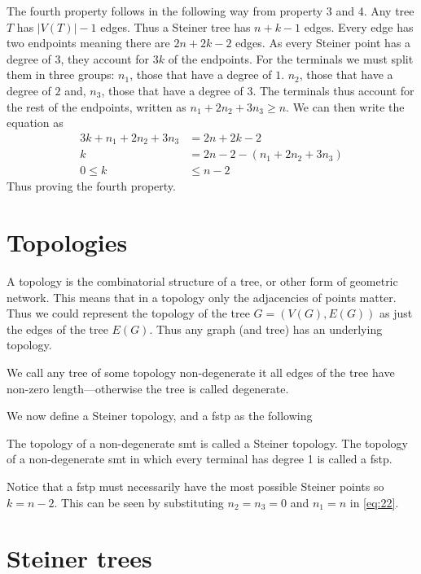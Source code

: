 The fourth property follows in the following way from property 3 and 4. Any
tree $T$ has $|V(T)|-1$ edges. Thus a Steiner tree has $n+k-1$ edges.
Every edge has two endpoints meaning there are $2 n + 2 k - 2$ edges. As every
Steiner point has a degree of $3$, they account for $3 k$ of the endpoints. For
the terminals we must split them in three groups: $n_1$, those that have a
degree of $1$. $n_2$, those that have a degree of $2$ and, $n_3$, those that
have a degree of $3$. The terminals thus account for the rest of the
endpoints, written as $n_1 + 2 n_2 + 3 n_3 \ge n$. We can then write the
equation as
%
\begin{align}
  \label{eq:22}
  3 k + n_1 + 2 n_2 + 3 n_3 &= 2 n + 2 k - 2 \\
  k &= 2 n - 2 - (n_1 + 2 n_2 + 3 n_3) \\
  0 \le k &\le n - 2
\end{align}
%
Thus proving the fourth property.

\section{Topologies}
\label{sec:topologies-1}

A topology is the combinatorial structure of a tree, or other form of geometric
network. This means that in a topology only the adjacencies of points
matter. Thus we could represent the topology of the tree $G = (V(G), E(G))$ as
just the edges of the tree $E(G)$. Thus any graph (and tree) has an
underlying topology.

We call any tree of some topology non-degenerate it all edges of the tree have
non-zero length---otherwise the tree is called degenerate.

We now define a Steiner topology, and a \gls{fstp} as the following
%
\begin{definition}
The topology of a non-degenerate \gls{smt} is called a Steiner topology. The
topology of a non-degenerate \gls{smt} in which every terminal has degree 1 is
called a \acrlong{fstp}.
\end{definition}
%
Notice that a \gls{fstp} must necessarily have the most possible Steiner points
so $ k = n - 2$. This can be seen by substituting $n_2 = n_3 = 0$ and $n_1 = n$
in \cref{eq:22}.

\section{Steiner trees}
\label{sec:steiner-trees}

